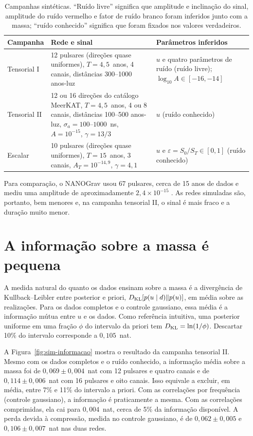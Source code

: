 \begin{table}[htbp]
\centering
\caption{Campanhas sintéticas. ``Ruído livre'' significa que amplitude e
inclinação do sinal, amplitude do ruído vermelho e fator de ruído
branco foram inferidos junto com a massa; ``ruído conhecido'' significa
que foram fixados nos valores verdadeiros.}
\label{tab:sim-campanhas}
\small
\begin{tabular}{p{}p{}p{}}
\toprule
Campanha & Rede e sinal & Parâmetros inferidos\\
\midrule
Tensorial I & 12 pulsares (direções quase uniformes), $T=4{,}5$~anos,
4 canais, distâncias 300--1000 anos-luz & $u$ e quatro parâmetros de
ruído (ruído livre); $\log_{10}A\in[-16,-14]$\\[1mm]
Tensorial II & 12 ou 16 direções do catálogo MeerKAT, $T=4{,}5$~anos,
4 ou 8 canais, distâncias 100--500 anos-luz,
$\sigma_a=100$--$1000$~ns, $A=10^{-15}$, $\gamma=13/3$ & $u$ (ruído
conhecido)\\[1mm]
Escalar & 10 pulsares (direções quase uniformes), $T=15$~anos,
3 canais, $A_T=10^{-14{,}9}$, $\gamma=4{,}1$ & $u$ e
$\varepsilon=S_0/S_T\in[0,1]$ (ruído conhecido)\\
\bottomrule
\end{tabular}
\end{table}

Para comparação, o NANOGrav usou 67 pulsares, cerca de 15 anos de dados
e mediu uma amplitude de aproximadamente $2{,}4\times10^{-15}$
\autocite{agazie2023}. As redes simuladas são, portanto, bem menores e,
na campanha tensorial II, o sinal é mais fraco e a duração muito menor.

\section{A informação sobre a massa é pequena}

A medida natural do quanto os dados ensinam sobre a massa é a
divergência de Kullback--Leibler entre posterior e priori,
$D_{\rm KL}[p(u\mid d)\Vert p(u)]$, em média sobre as realizações. Para
os dados completos e o controle gaussiano, essa média é a informação
mútua entre $u$ e os dados. Como referência intuitiva, uma posterior
uniforme em uma fração $\phi$ do intervalo da priori tem
$D_{\rm KL}=\ln(1/\phi)$. Descartar 10\% do intervalo corresponde a
$0{,}105$~nat.

A Figura~\ref{fig:sim-informacao} mostra o resultado da campanha
tensorial II. Mesmo com os dados completos e o ruído conhecido, a
informação média sobre a massa foi de $0{,}069\pm0{,}004$~nat com 12
pulsares e quatro canais e de $0{,}114\pm0{,}006$~nat com 16 pulsares e
oito canais. Isso equivale a excluir, em média, entre 7\% e 11\% do
intervalo a priori. Com as correlações por frequência (controle
gaussiano), a informação é praticamente a mesma. Com as correlações
comprimidas, ela cai para $0{,}004$~nat, cerca de 5\% da informação
disponível. A perda devida à compressão, medida no controle gaussiano,
é de $0{,}062\pm0{,}005$ e $0{,}106\pm0{,}007$~nat nas duas redes.

